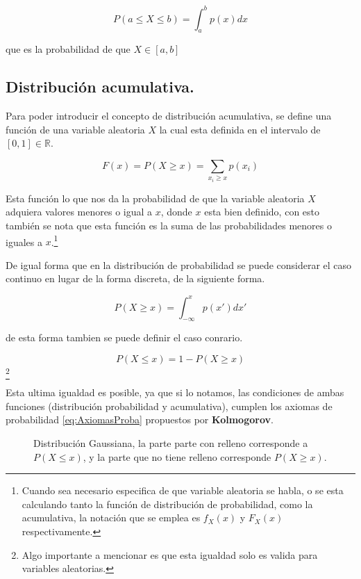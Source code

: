 \begin{equation}
	P(a\leq X \leq b) = \int_a^b p (x)dx
\end{equation}

que es la probabilidad de que $X\in [a,b]$

\subsection{Distribución acumulativa.}

Para poder introducir el concepto de distribución acumulativa, se define una función de una variable aleatoria $X$ la cual esta definida en el intervalo de  $[0,1] \in \mathbb{R}$.

\begin{equation}
	F(x) = P(X\geq x) = \sum_{x_i\geq x}p(x_i)
\end{equation}

Esta función lo que nos da la probabilidad de que la variable aleatoria $X$ adquiera valores menores o igual a $x$, donde $x$ esta bien definido, con esto también se nota que esta función es la suma de las probabilidades menores o iguales a $x$.\footnote{Cuando sea necesario especifica de que variable aleatoria se habla, o se esta calculando tanto la función de distribución de probabilidad, como la acumulativa, la notación que se emplea es $f_X(x)$ y $F_X(x)$ respectivamente.}

De igual forma que en la distribución de probabilidad se puede considerar el caso continuo en lugar de la forma discreta, de la siguiente forma.

\begin{equation}
	P(X\geq x) = \int_{-\infty}^x p(x')dx'
\end{equation}

de esta forma tambien se puede definir el caso conrario.

\begin{equation}
	P(X\leq x) = 1 - P(X\geq x)
\end{equation}\footnote{Algo importante a mencionar es que esta igualdad solo es valida para variables aleatorias.}

Esta ultima igualdad es posible, ya que si lo notamos, las condiciones de ambas funciones (distribución probabilidad y acumulativa), cumplen los axiomas de probabilidad \ref{eq:AxiomasProba} propuestos por \textbf{Kolmogorov}.

\begin{figure}[!ht]
    \centering
    \scalebox{1}{}
    \caption{Distribución Gaussiana, la parte parte con relleno corresponde a $P(X\leq x)$, y la parte que no tiene relleno corresponde $P(X\geq x)$.}
    \label{fig:Diagrama-Enf-Sin}
\end{figure}


